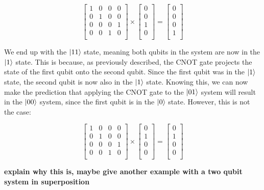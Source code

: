 \documentclass{article}
\begin{document}
\[
	\begin{bmatrix}
		1 & 0 & 0 & 0 \\
		0 & 1 & 0 & 0 \\
		0 & 0 & 0 & 1 \\
		0 & 0 & 1 & 0 \\
	\end{bmatrix}
	\times
	\begin{bmatrix}
		0 \\
		0 \\
		1 \\
		0 \\
	\end{bmatrix}
	=
	\begin{bmatrix}
		0 \\
		0 \\
		0 \\
		1 \\
	\end{bmatrix}
\]

We end up with the $\ket{11}$ state, meaning both qubits in the system are now in the $\ket{1}$ state. This is because, as previously described, the CNOT gate projects the state
of the first qubit onto the second qubit. Since the first qubit was in the $\ket{1}$ state, the second qubit is now also in the $\ket{1}$ state. Knowing this, we can now make 
the prediction that applying the CNOT gate to the $\ket{01}$ system will result in the $\ket{00}$ system, since the first qubit is in the $\ket{0}$ state. However, this is not
the case:

\[
	\begin{bmatrix}
		1 & 0 & 0 & 0 \\
		0 & 1 & 0 & 0 \\
		0 & 0 & 0 & 1 \\
		0 & 0 & 1 & 0 \\
	\end{bmatrix}
	\times
	\begin{bmatrix}
		0 \\
		1 \\
		0 \\
		0 \\
	\end{bmatrix}
	=
	\begin{bmatrix}
		0 \\
		1 \\
		0 \\
		0 \\
	\end{bmatrix}
\]

\textbf{explain why this is, maybe give another example with a two qubit system in superposition}
\end{document}
